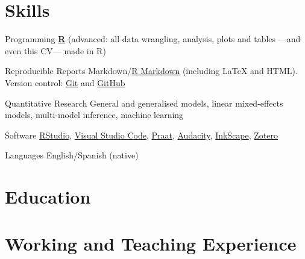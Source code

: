 \documentclass[11pt,a4paper,]{awesome-cv}
\begin{document}
\section{Skills}\label{skills}

\begin{cvskills}
  \cvskill
    {Programming}
    {\href{https://www.r-project.org/}{\textbf{R}} (advanced: all data wrangling, analysis, plots and tables —and even this CV— made in R)}

  \cvskill
    {Reproducible Reports}
    {Markdown/\href{https://rmarkdown.rstudio.com/}{R Markdown} (including {\selectfont\LaTeX} and HTML). Version control: \href{https://git-scm.com/}{Git} \faGit* and \href{https://github.com/JDLeongomez}{GitHub} \faGithub}

  \cvskill
    {Quantitative Research}
    {General and generalised models, linear mixed-effects models, multi-model inference, machine learning}

  \cvskill
    {Software}
    {\href{https://posit.co/products/open-source/rstudio/}{RStudio}, \href{https://code.visualstudio.com/}{Visual Studio Code}, \href{https://www.fon.hum.uva.nl/praat/}{Praat}, \href{https://www.audacityteam.org/}{Audacity}, \href{https://inkscape.org/}{InkScape}, \href{https://www.zotero.org/}{Zotero}}

  \cvskill
    {Languages}
    {English/Spanish (native)}
\end{cvskills}

\section{Education}\label{education}

\begin{cventries}
    \vspace{-4.0mm}
    \vspace{-4.0mm}
    \vspace{-4.0mm}
\end{cventries}

\section{Working and Teaching
Experience}\label{working-and-teaching-experience}
\end{document}
